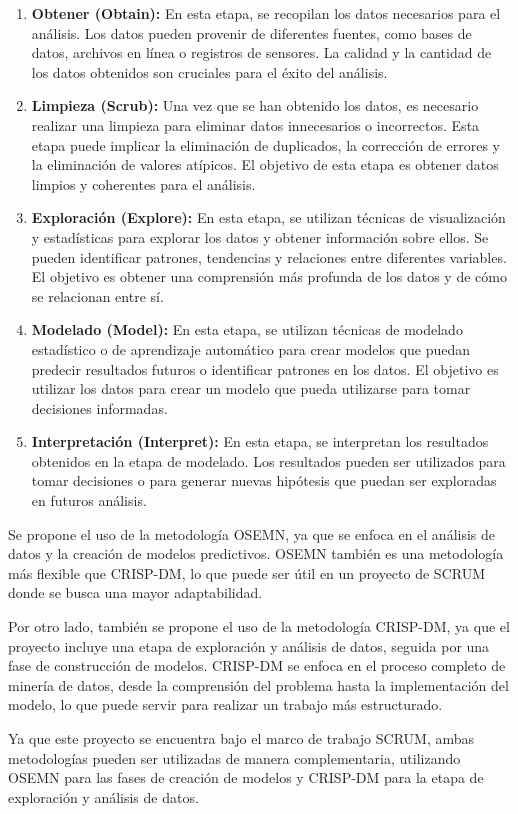 \begin{enumerate}
    \item \textbf{Obtener (Obtain):} En esta etapa, se recopilan los datos necesarios para el análisis. Los datos pueden provenir de diferentes fuentes, como bases de datos, archivos en línea o registros de sensores. La calidad y la cantidad de los datos obtenidos son cruciales para el éxito del análisis.
    \item \textbf{Limpieza (Scrub):} Una vez que se han obtenido los datos, es necesario realizar una limpieza para eliminar datos innecesarios o incorrectos. Esta etapa puede implicar la eliminación de duplicados, la corrección de errores y la eliminación de valores atípicos. El objetivo de esta etapa es obtener datos limpios y coherentes para el análisis.
    \item \textbf{Exploración (Explore):} En esta etapa, se utilizan técnicas de visualización y estadísticas para explorar los datos y obtener información sobre ellos. Se pueden identificar patrones, tendencias y relaciones entre diferentes variables. El objetivo es obtener una comprensión más profunda de los datos y de cómo se relacionan entre sí.
    \item \textbf{Modelado (Model):} En esta etapa, se utilizan técnicas de modelado estadístico o de aprendizaje automático para crear modelos que puedan predecir resultados futuros o identificar patrones en los datos. El objetivo es utilizar los datos para crear un modelo que pueda utilizarse para tomar decisiones informadas.
    \item \textbf{Interpretación (Interpret):} En esta etapa, se interpretan los resultados obtenidos en la etapa de modelado. Los resultados pueden ser utilizados para tomar decisiones o para generar nuevas hipótesis que puedan ser exploradas en futuros análisis.
\end{enumerate}

Se propone el uso de la metodología OSEMN, ya que se enfoca en el análisis de datos y la creación de modelos predictivos. OSEMN también es una metodología más flexible que CRISP-DM, lo que puede ser útil en un proyecto de SCRUM donde se busca una mayor adaptabilidad.

Por otro lado, también se propone el uso de la metodología CRISP-DM, ya que el proyecto incluye una etapa de exploración y análisis de datos, seguida por una fase de construcción de modelos. CRISP-DM se enfoca en el proceso completo de minería de datos, desde la comprensión del problema hasta la implementación del modelo, lo que puede servir para realizar un trabajo más estructurado.

Ya que este proyecto se encuentra bajo el marco de trabajo SCRUM, ambas metodologías pueden ser utilizadas de manera complementaria, utilizando OSEMN para las fases de creación de modelos y CRISP-DM para la etapa de exploración y análisis de datos.
